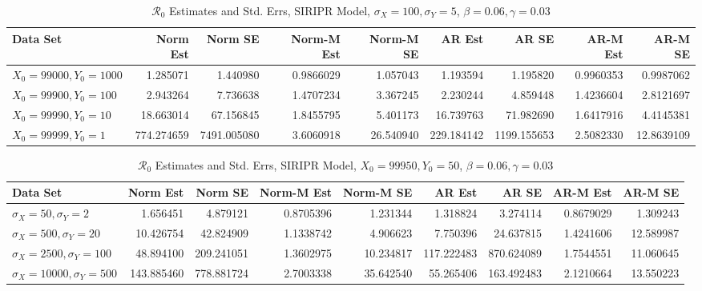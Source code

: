 \message{ !name(draft_v13.tex)}\documentclass[12pt]{article}
\newcommand{\rr}{\ensuremath{\mathcal{R}_0}}
\begin{document}
\begin{table}[H]
	
	\caption{\label{tab:}$\rr$ Estimates and Std. Errs, SIRIPR Model,
		$\sigma_X = 100, \sigma_Y = 5$, $\beta = 0.06, \gamma = 0.03$}
	\centering
	\begin{footnotesize}
		\begin{tabular}[t]{l|r|r|r|r|r|r|r|r}
			\hline
			Data Set & Norm Est & Norm SE & Norm-M Est & Norm-M SE & AR Est & AR SE & AR-M Est & AR-M SE\\
			\hline
			$X_0 = 99000, Y_0 = 1000$ & 1.285071 & 1.440980 & 0.9866029 & 1.057043 & 1.193594 & 1.195820 & 0.9960353 & 0.9987062\\
			\hline
			$X_0 = 99900, Y_0 = 100$ & 2.943264 & 7.736638 & 1.4707234 & 3.367245 & 2.230244 & 4.859448 & 1.4236604 & 2.8121697\\
			\hline
			$X_0 = 99990, Y_0 = 10$ & 18.663014 & 67.156845 & 1.8455795 & 5.401173 & 16.739763 & 71.982690 & 1.6417916 & 4.4145381\\
			\hline
			$X_0 = 99999, Y_0 = 1$ & 774.274659 & 7491.005080 & 3.6060918 & 26.540940 & 229.184142 & 1199.155653 & 2.5082330 & 12.8639109\\
			\hline
		\end{tabular}
	\end{footnotesize}
\end{table}

\begin{table}[H]
	
	\caption{\label{tab:}$\rr$ Estimates and Std. Errs, SIRIPR Model,
		$X_0 = 99950, Y_0 = 50$, $\beta = 0.06, \gamma = 0.03$}
	\centering
	\begin{footnotesize}
		\begin{tabular}[t]{l|r|r|r|r|r|r|r|r}
			\hline
			Data Set & Norm Est & Norm SE & Norm-M Est & Norm-M SE & AR Est & AR SE & AR-M Est & AR-M SE\\
			\hline
			$\sigma_X = 50, \sigma_Y = 2$ & 1.656451 & 4.879121 & 0.8705396 & 1.231344 & 1.318824 & 3.274114 & 0.8679029 & 1.309243\\
			\hline
			$\sigma_X = 500, \sigma_Y = 20$ & 10.426754 & 42.824909 & 1.1338742 & 4.906623 & 7.750396 & 24.637815 & 1.4241606 & 12.589987\\
			\hline
			$\sigma_X = 2500, \sigma_Y = 100$ & 48.894100 & 209.241051 & 1.3602975 & 10.234817 & 117.222483 & 870.624089 & 1.7544551 & 11.060645\\
			\hline
			$\sigma_X = 10000, \sigma_Y = 500$ & 143.885460 & 778.881724 & 2.7003338 & 35.642540 & 55.265406 & 163.492483 & 2.1210664 & 13.550223\\
			\hline
		\end{tabular}
	\end{footnotesize}
\end{table}
\end{document}
